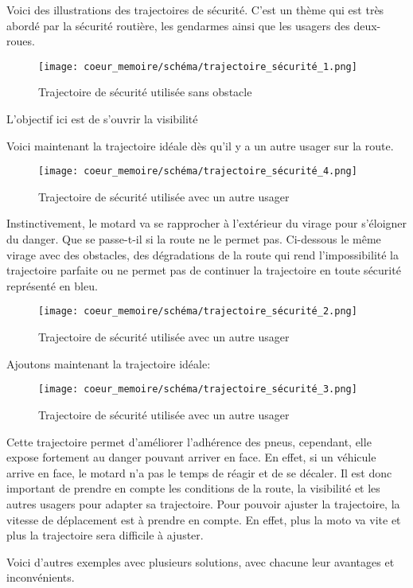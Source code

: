 \vspace{0.5cm}
Voici des illustrations des trajectoires de sécurité. C'est un thème qui est très abordé par la sécurité routière, les gendarmes ainsi que les usagers des deux-roues. 
\begin{figure}[H]
    \centering
    \texttt{[image: coeur\_memoire/schéma/trajectoire\_sécurité\_1.png]} 
    \caption{Trajectoire de sécurité utilisée sans obstacle}
\end{figure}
L'objectif ici est de s'ouvrir la visibilité

Voici maintenant la trajectoire idéale dès qu'il y a un autre usager sur la route.
\begin{figure}[H]
    \centering
    \texttt{[image: coeur\_memoire/schéma/trajectoire\_sécurité\_4.png]} 
    \caption{Trajectoire de sécurité utilisée avec un autre usager}
\end{figure}
Instinctivement, le motard va se rapprocher à l'extérieur du virage pour s'éloigner du danger.
Que se passe-t-il si la route ne le permet pas. Ci-dessous le même virage avec des obstacles, des dégradations de la route qui rend l'impossibilité la trajectoire parfaite ou ne permet pas de continuer la trajectoire en toute sécurité représenté en bleu. 
\begin{figure}[H]
    \centering
    \texttt{[image: coeur\_memoire/schéma/trajectoire\_sécurité\_2.png]} 
    \caption{Trajectoire de sécurité utilisée avec un autre usager}
\end{figure}
Ajoutons maintenant la trajectoire idéale:
\begin{figure}[H]
    \centering
    \texttt{[image: coeur\_memoire/schéma/trajectoire\_sécurité\_3.png]} 
    \caption{Trajectoire de sécurité utilisée avec un autre usager}
\end{figure}
Cette trajectoire permet d'améliorer l'adhérence des pneus, cependant, elle expose fortement au danger pouvant arriver en face. En effet, si un véhicule arrive en face, le motard n'a pas le temps de réagir et de se décaler. Il est donc important de prendre en compte les conditions de la route, la visibilité et les autres usagers pour adapter sa trajectoire. Pour pouvoir ajuster la trajectoire, la vitesse de déplacement est à prendre en compte. En effet, plus la moto va vite et plus la trajectoire sera difficile à ajuster.

Voici d'autres exemples avec plusieurs solutions, avec chacune leur avantages et inconvénients.

